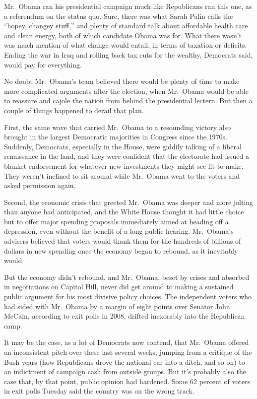 ﻿\documentclass[12pt]{article}
\begin{document}
Mr.~Obama ran his presidential campaign much like Republicans ran this one, as a referendum on the
status quo. Sure, there was what Sarah Palin calls the ``hopey, changey stuff,'' and plenty of
standard talk about affordable health care and clean energy, both of which candidate Obama was for.
What there wasn't was much mention of what change would entail, in terms of taxation or deficits.
Ending the war in Iraq and rolling back tax cuts for the wealthy, Democrats said, would pay for
everything.

No doubt Mr.~Obama's team believed there would be plenty of time to make more complicated arguments
after the election, when Mr.~Obama would be able to reassure and cajole the nation from behind the
presidential lectern. But then a couple of things happened to derail that plan.

First, the same wave that carried Mr.~Obama to a resounding victory also brought in the largest
Democratic majorities in Congress since the 1970s. Suddenly, Democrats, especially in the House,
were giddily talking of a liberal renaissance in the land, and they were confident that the
electorate had issued a blanket endorsement for whatever new investments they might see fit to make.
They weren't inclined to sit around while Mr.~Obama went to the voters and asked permission again.

Second, the economic crisis that greeted Mr.~Obama was deeper and more jolting than anyone had
anticipated, and the White House thought it had little choice but to offer major spending proposals
immediately aimed at heading off a depression, even without the benefit of a long public hearing.
Mr.~Obama's advisers believed that voters would thank them for the hundreds of billions of dollars
in new spending once the economy began to rebound, as it inevitably would.

But the economy didn't rebound, and Mr.~Obama, beset by crises and absorbed in negotiations on
Capitol Hill, never did get around to making a sustained public argument for his most divisive
policy choices. The independent voters who had sided with Mr.~Obama by a margin of eight points over
Senator John McCain, according to exit polls in 2008, drifted inexorably into the Republican camp.

It may be the case, as a lot of Democrats now contend, that Mr.~Obama offered an inconsistent pitch
over these last several weeks, jumping from a critique of the Bush years (how Republicans drove the
national car into a ditch, and so on) to an indictment of campaign cash from outside groups. But
it's probably also the case that, by that point, public opinion had hardened. Some 62 percent of
voters in exit polls Tuesday said the country was on the wrong track.
\end{document}
